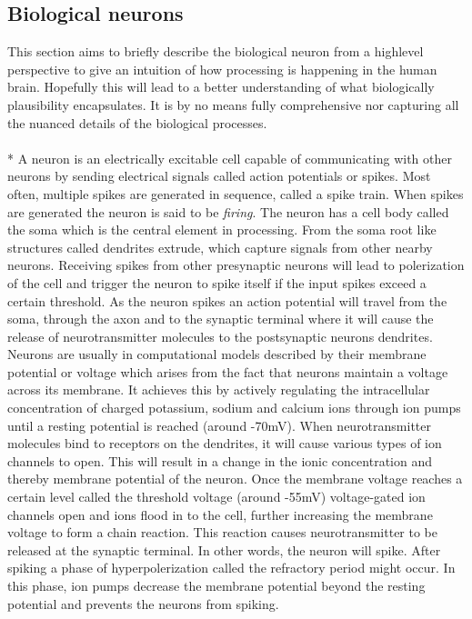 \documentclass[a4paper,11pt]{article} %
\begin{document}
\subsection{Biological neurons} \label{sec:neurons}
This section aims to briefly describe the biological neuron from a highlevel perspective to give an intuition of how processing is happening in the human brain. Hopefully this will lead to a better understanding of what biologically plausibility encapsulates. It is by no means fully comprehensive nor capturing all the nuanced details of the biological processes. \\
\\*
A neuron is an electrically excitable cell capable of communicating with other neurons by sending electrical signals called action potentials or spikes. Most often, multiple spikes are generated in sequence, called a spike train. When spikes are generated the neuron is said to be \textit{firing}. The neuron has a cell body called the soma which is the central element in processing. From the soma root like structures called dendrites extrude, which capture signals from other nearby neurons. Receiving spikes from other presynaptic neurons will lead to polerization of the cell and trigger the neuron to spike itself if the input spikes exceed a certain threshold. As the neuron spikes an action potential will travel from the soma, through the axon and to the synaptic terminal where it will cause the release of neurotransmitter molecules to the postsynaptic neurons dendrites. Neurons are usually in computational models described by their membrane potential or voltage which arises from the fact that neurons maintain a voltage across its membrane. It achieves this by actively regulating the intracellular concentration of charged potassium, sodium and calcium ions through ion pumps until a resting potential is reached (around -70mV). When neurotransmitter molecules bind to receptors on the dendrites, it will cause various types of ion channels to open. This will result in a change in the ionic concentration and thereby membrane potential of the neuron. Once the membrane voltage reaches a certain level called the threshold voltage (around -55mV) voltage-gated ion channels open and ions flood in to the cell, further increasing the membrane voltage to form a chain reaction. This reaction causes neurotransmitter to be released at the synaptic terminal. In other words, the neuron will spike. After spiking a phase of hyperpolerization called the refractory period might occur. In this phase, ion pumps decrease the membrane potential beyond the resting potential and prevents the neurons from spiking. \\
\end{document}
